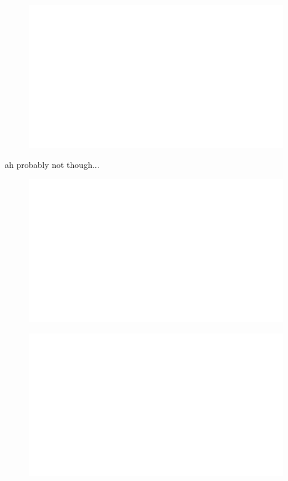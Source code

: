 \begin{centering}
    \begin{figure}
        \centering
        \includegraphics[width=\textwidth]{whyareyoucheckingthenameofthisfile.png}
    \end{figure}
\end{centering}
\noindent


\noindent
ah probably not though...

\begin{centering}
    \begin{figure}[h]
        \centering
        \includegraphics[width=\textwidth]{whyareyoucheckingthenameofthisfile.png}
    \end{figure}
\end{centering}

\begin{centering}
    \begin{figure}[h!]
        \centering
        \includegraphics[width=\textwidth]{whyareyoucheckingthenameofthisfile.png}
    \end{figure}
\end{centering}

